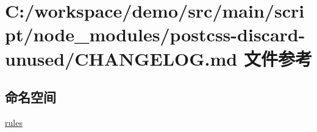 \hypertarget{postcss-discard-unused_2_c_h_a_n_g_e_l_o_g_8md}{}\section{C\+:/workspace/demo/src/main/script/node\+\_\+modules/postcss-\/discard-\/unused/\+C\+H\+A\+N\+G\+E\+L\+OG.md 文件参考}
\label{postcss-discard-unused_2_c_h_a_n_g_e_l_o_g_8md}
\subsection*{命名空间}
\begin{DoxyCompactItemize}
\item 
 \mbox{\hyperlink{namespacerules}{rules}}
\end{DoxyCompactItemize}
